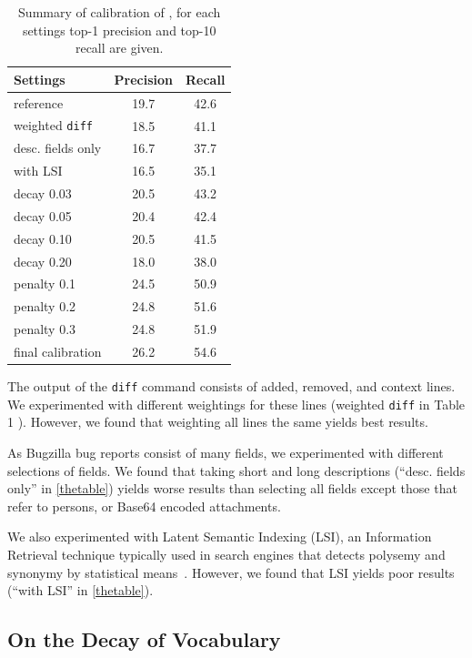 \documentclass[10pt]{book}
\begin{document}
\begin{table}
\center
{\footnotesize \begin{tabular}{l | c  c}
  Settings & Precision & Recall \\ \hline
  reference & 19.7 & 42.6 \\ 
  weighted \verb$diff$ & 18.5 & 41.1 \\
  desc. fields only & 16.7 & 37.7 \\
  with LSI & 16.5 & 35.1 \\
  decay 0.03 & 20.5 & 43.2 \\ 
  decay 0.05 & 20.4 & 42.4 \\ 
  decay 0.10 & 20.5 & 41.5 \\ 
  decay 0.20 & 18.0 & 38.0 \\ 
  penalty 0.1 & 24.5 & 50.9 \\ 
  penalty 0.2 & 24.8 & 51.6 \\ 
  penalty 0.3 & 24.8 & 51.9 \\
  final calibration & 26.2 & 54.6 \\
\end{tabular}
}\vspace{0.1in}
\caption{Summary of calibration of \trainingset, for each settings top-1 precision and top-10 recall are given.}
\label{thetable}
\end{table}

The output of the \verb$diff$ command consists of added, removed, and context lines. We experimented with different weightings for these lines (weighted \verb$diff$ in Table 1%
). However, we found that weighting all lines the same yields best results. 

As Bugzilla bug reports consist of many fields, we experimented with different selections of fields. We found that taking short and long descriptions (``desc. fields only'' in \autoref{thetable}) yields worse results than selecting all fields except those that refer to persons, or Base64 encoded attachments. 

We also experimented with Latent Semantic Indexing (LSI), an Information Retrieval technique typically used in search engines that detects polysemy and synonymy by statistical means~\cite{Deer90a}. However, we found that LSI yields poor results (``with LSI'' in \autoref{thetable}).

\subsection{On the Decay of Vocabulary}
\end{document}
